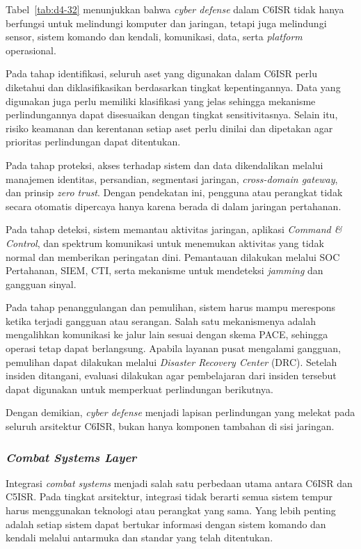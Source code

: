Tabel~\ref{tab:d4-32} menunjukkan bahwa \textit{cyber defense} dalam C6ISR tidak hanya berfungsi untuk melindungi komputer dan jaringan, tetapi juga melindungi sensor, sistem komando dan kendali, komunikasi, data, serta \textit{platform} operasional.

Pada tahap identifikasi, seluruh aset yang digunakan dalam C6ISR perlu diketahui dan diklasifikasikan berdasarkan tingkat kepentingannya. Data yang digunakan juga perlu memiliki klasifikasi yang jelas sehingga mekanisme perlindungannya dapat disesuaikan dengan tingkat sensitivitasnya. Selain itu, risiko keamanan dan kerentanan setiap aset perlu dinilai dan dipetakan agar prioritas perlindungan dapat ditentukan.

Pada tahap proteksi, akses terhadap sistem dan data dikendalikan melalui manajemen identitas, persandian, segmentasi jaringan, \textit{cross-domain gateway}, dan prinsip \textit{zero trust}. Dengan pendekatan ini, pengguna atau perangkat tidak secara otomatis dipercaya hanya karena berada di dalam jaringan pertahanan.

Pada tahap deteksi, sistem memantau aktivitas jaringan, aplikasi \textit{Command \& Control}, dan spektrum komunikasi untuk menemukan aktivitas yang tidak normal dan memberikan peringatan dini. Pemantauan dilakukan melalui SOC Pertahanan, SIEM, CTI, serta mekanisme untuk mendeteksi \textit{jamming} dan gangguan sinyal.

Pada tahap penanggulangan dan pemulihan, sistem harus mampu merespons ketika terjadi gangguan atau serangan. Salah satu mekanismenya adalah mengalihkan komunikasi ke jalur lain sesuai dengan skema PACE, sehingga operasi tetap dapat berlangsung. Apabila layanan pusat mengalami gangguan, pemulihan dapat dilakukan melalui \textit{Disaster Recovery Center} (DRC). Setelah insiden ditangani, evaluasi dilakukan agar pembelajaran dari insiden tersebut dapat digunakan untuk memperkuat perlindungan berikutnya.

Dengan demikian, \textit{cyber defense} menjadi lapisan perlindungan yang melekat pada seluruh arsitektur C6ISR, bukan hanya komponen tambahan di sisi jaringan.

\subsubsection{\textit{Combat Systems Layer}}

Integrasi \textit{combat systems} menjadi salah satu perbedaan utama antara C6ISR dan C5ISR. Pada tingkat arsitektur, integrasi tidak berarti semua sistem tempur harus menggunakan teknologi atau perangkat yang sama. Yang lebih penting adalah setiap sistem dapat bertukar informasi dengan sistem komando dan kendali melalui antarmuka dan standar yang telah ditentukan.

